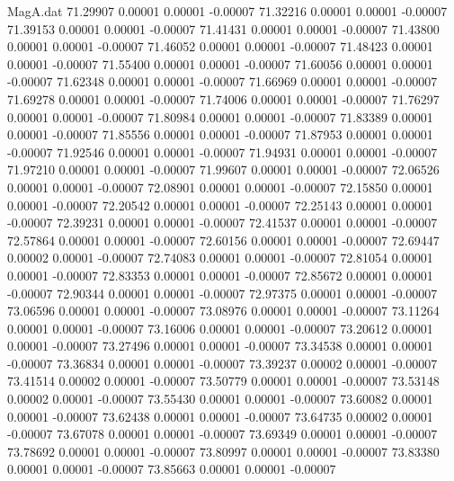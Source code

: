 \begin{filecontents}{MagA.dat}
  71.29907    0.00001    0.00001   -0.00007
  71.32216    0.00001    0.00001   -0.00007
  71.39153    0.00001    0.00001   -0.00007
  71.41431    0.00001    0.00001   -0.00007
  71.43800    0.00001    0.00001   -0.00007
  71.46052    0.00001    0.00001   -0.00007
  71.48423    0.00001    0.00001   -0.00007
  71.55400    0.00001    0.00001   -0.00007
  71.60056    0.00001    0.00001   -0.00007
  71.62348    0.00001    0.00001   -0.00007
  71.66969    0.00001    0.00001   -0.00007
  71.69278    0.00001    0.00001   -0.00007
  71.74006    0.00001    0.00001   -0.00007
  71.76297    0.00001    0.00001   -0.00007
  71.80984    0.00001    0.00001   -0.00007
  71.83389    0.00001    0.00001   -0.00007
  71.85556    0.00001    0.00001   -0.00007
  71.87953    0.00001    0.00001   -0.00007
  71.92546    0.00001    0.00001   -0.00007
  71.94931    0.00001    0.00001   -0.00007
  71.97210    0.00001    0.00001   -0.00007
  71.99607    0.00001    0.00001   -0.00007
  72.06526    0.00001    0.00001   -0.00007
  72.08901    0.00001    0.00001   -0.00007
  72.15850    0.00001    0.00001   -0.00007
  72.20542    0.00001    0.00001   -0.00007
  72.25143    0.00001    0.00001   -0.00007
  72.39231    0.00001    0.00001   -0.00007
  72.41537    0.00001    0.00001   -0.00007
  72.57864    0.00001    0.00001   -0.00007
  72.60156    0.00001    0.00001   -0.00007
  72.69447    0.00002    0.00001   -0.00007
  72.74083    0.00001    0.00001   -0.00007
  72.81054    0.00001    0.00001   -0.00007
  72.83353    0.00001    0.00001   -0.00007
  72.85672    0.00001    0.00001   -0.00007
  72.90344    0.00001    0.00001   -0.00007
  72.97375    0.00001    0.00001   -0.00007
  73.06596    0.00001    0.00001   -0.00007
  73.08976    0.00001    0.00001   -0.00007
  73.11264    0.00001    0.00001   -0.00007
  73.16006    0.00001    0.00001   -0.00007
  73.20612    0.00001    0.00001   -0.00007
  73.27496    0.00001    0.00001   -0.00007
  73.34538    0.00001    0.00001   -0.00007
  73.36834    0.00001    0.00001   -0.00007
  73.39237    0.00002    0.00001   -0.00007
  73.41514    0.00002    0.00001   -0.00007
  73.50779    0.00001    0.00001   -0.00007
  73.53148    0.00002    0.00001   -0.00007
  73.55430    0.00001    0.00001   -0.00007
  73.60082    0.00001    0.00001   -0.00007
  73.62438    0.00001    0.00001   -0.00007
  73.64735    0.00002    0.00001   -0.00007
  73.67078    0.00001    0.00001   -0.00007
  73.69349    0.00001    0.00001   -0.00007
  73.78692    0.00001    0.00001   -0.00007
  73.80997    0.00001    0.00001   -0.00007
  73.83380    0.00001    0.00001   -0.00007
  73.85663    0.00001    0.00001   -0.00007

\end{filecontents}
